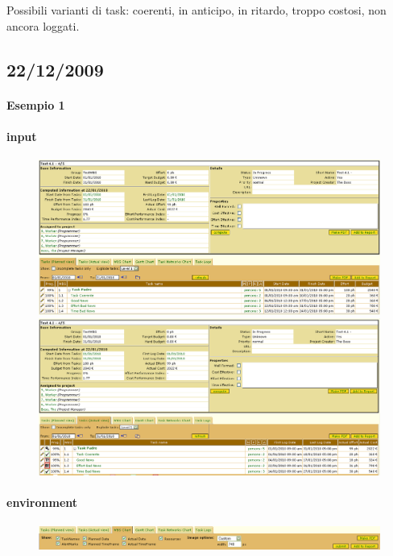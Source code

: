 Possibili varianti di task: coerenti, in anticipo, in ritardo, troppo costosi, non ancora loggati.

\subsection{22/12/2009}
\paragraph{Esempio 1}
\paragraph{input}
\begin{figure}
\centering
\includegraphics[width=\textwidth]{tests/TEST_WBS/4.1/4.1_4_5/Esempio_1/input.png}
\includegraphics[width=\textwidth]{tests/TEST_WBS/4.1/4.1_4_5/Esempio_1/input_actual.png}
\end{figure}
\paragraph{environment}
\begin{figure}
\centering
\includegraphics[width=\textwidth]{tests/TEST_WBS/4.1/4.1_4_5/Esempio_1/environment.png}
\end{figure}
